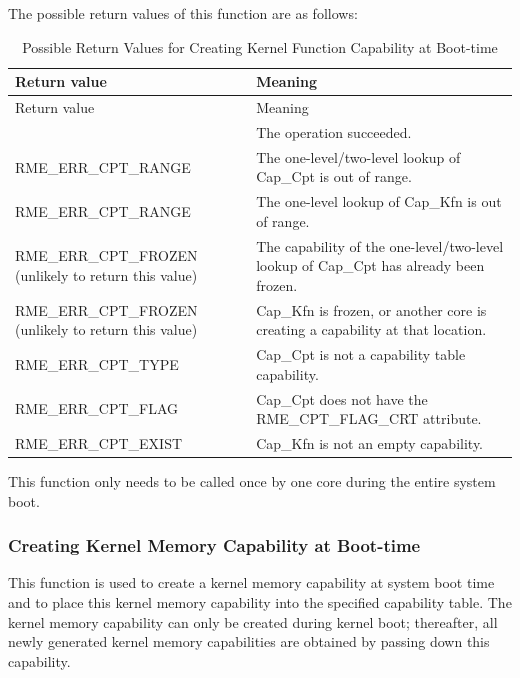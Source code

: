 The possible return values of this function are as follows:

\begin{xltabular}{\textwidth}{@{}>{\hsize\raggedright\arraybackslash}X>{\hsize\raggedright\arraybackslash}X@{}}
\caption{Possible Return Values for Creating Kernel Function Capability at Boot-time}\label{tab:7-54-create-kernel-function-capability-at-boot-return-values}\\
\toprule
Return value & Meaning\tabularnewline
\endfirsthead
\toprule
Return value & Meaning\tabularnewline
\midrule
\endhead
\bottomrule
{} & The operation succeeded.\tabularnewline
    RME\_ERR\_CPT\_RANGE & The one-level/two-level lookup of Cap\_Cpt is out of range.\tabularnewline
    RME\_ERR\_CPT\_RANGE & The one-level lookup of Cap\_Kfn is out of range.\tabularnewline
    RME\_ERR\_CPT\_FROZEN (unlikely to return this value) & The capability of the one-level/two-level lookup of Cap\_Cpt has already been frozen.\tabularnewline
    RME\_ERR\_CPT\_FROZEN (unlikely to return this value) & Cap\_Kfn is frozen, or another core is creating a capability at that location.\tabularnewline
    RME\_ERR\_CPT\_TYPE & Cap\_Cpt is not a capability table capability.\tabularnewline
    RME\_ERR\_CPT\_FLAG & Cap\_Cpt does not have the RME\_CPT\_FLAG\_CRT attribute.\tabularnewline
    RME\_ERR\_CPT\_EXIST & Cap\_Kfn is not an empty capability.\tabularnewline
\end{xltabular}
\nopagebreak[4]

This function only needs to be called once by one core during the entire system boot.

\subsubsection{Creating Kernel Memory Capability at Boot-time}\label{subsubsec:7-create-kernel-memory-capability-at-boot}

This function is used to create a kernel memory capability at system boot time and to place this kernel memory capability into the specified capability table. The kernel memory capability can only be created during kernel boot; thereafter, all newly generated kernel memory capabilities are obtained by passing down this capability.

